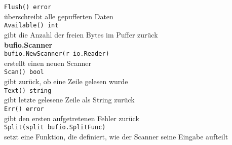 \documentclass[twoside,a4paper,12pt]{article}
\begin{document}
\begin{tabbing}
 \> \verb|Flush() error| \\ 
 \> überschreibt alle gepufferten Daten \\ 
 \> \verb|Available() int| \\ 
 \> gibt die Anzahl der freien Bytes im Puffer zurück \\ 
 \> \textbf{bufio.Scanner} \\ 
 \> \verb|bufio.NewScanner(r io.Reader)| \\ 
 \> erstellt einen neuen Scanner \\ 
 \> \verb|Scan() bool| \\ 
 \> gibt zurück, ob eine Zeile gelesen wurde \\ 
 \> \verb|Text() string| \\ 
 \> gibt letzte gelesene Zeile als String zurück \\ 
 \> \verb|Err() error| \\ 
 \> gibt den ersten aufgetretenen Fehler zurück \\ 
 \> \verb|Split(split bufio.SplitFunc)| \\ 
 \> setzt eine Funktion, die definiert, wie der Scanner seine Eingabe aufteilt \\ 
\end{tabbing}

\newpage
\end{document}
